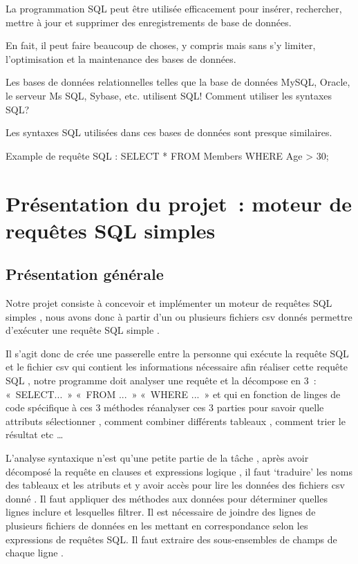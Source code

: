 \documentclass[oneside,13pt,a4paper]{report}
\begin{document}
            La programmation SQL peut être utilisée efficacement pour insérer, rechercher, mettre à jour et supprimer des enregistrements de base de données.

            En fait, il peut faire beaucoup de choses, y compris mais sans s'y limiter, l'optimisation et la maintenance des bases de données.

            Les bases de données relationnelles telles que la base de données MySQL, Oracle, le serveur Ms SQL, Sybase, etc. utilisent SQL! Comment utiliser les syntaxes SQL?

            Les syntaxes SQL utilisées dans ces bases de données sont presque similaires.

            Example de requête SQL : SELECT * FROM Members WHERE Age > 30;

    \chapter{Présentation du projet : moteur de requêtes SQL simples}

    \section{Présentation générale}

        Notre projet consiste à concevoir et implémenter un moteur de requêtes SQL simples , nous avons donc à partir d’un ou plusieurs fichiers csv donnés permettre d’exécuter une requête SQL simple .

        Il s’agit  donc de crée une passerelle entre la personne qui exécute la requête SQL et le fichier csv qui contient les informations nécessaire afin réaliser cette requête SQL , notre programme doit analyser une requête et la décompose en 3 : « SELECT... » « FROM ... » « WHERE ... » et qui en fonction de linges de code spécifique à ces 3 méthodes réanalyser ces 3 parties pour savoir quelle attributs sélectionner , comment combiner différents tableaux , comment trier le résultat etc … 

        L’analyse syntaxique n’est qu’une petite partie de la tâche , après avoir décomposé la requête en clauses et expressions logique , il faut ‘traduire’ les noms des tableaux et les atributs et y avoir accès pour lire les données des fichiers csv donné . Il faut appliquer des méthodes aux données pour déterminer quelles lignes inclure et lesquelles filtrer. Il est nécessaire de joindre des lignes de plusieurs fichiers de données en les mettant en correspondance selon les expressions de requêtes SQL. Il faut extraire des sous-ensembles de champs de chaque ligne . 
        
\end{document}
